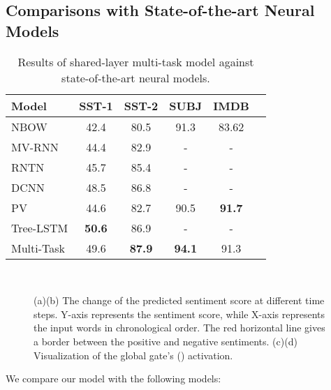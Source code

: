 \documentclass{article}
\begin{document}
\subsection{Comparisons with State-of-the-art Neural Models}



\begin{table}[!th]\small
\center
\begin{tabular}{|l|*{5}{c|}}
\hline
\textbf{Model} &	 SST-1 &	 SST-2 &	SUBJ&	 IMDB \\

\hline
NBOW & 42.4 & 80.5 & 91.3 & 83.62 \\
MV-RNN  &	 44.4 &	 82.9 &	 -&	 - \\
RNTN  &	 45.7 &	 85.4 &	 -&	 - \\
DCNN  &	 48.5&	 86.8 &	 - &	 - \\
PV  &	 44.6&	 82.7 & 90.5 &	 \textbf{91.7} \\
Tree-LSTM  &	 \textbf{50.6}&	 86.9 & - & - \\
\hline
Multi-Task &   49.6    &   \textbf{87.9}    &   \textbf{94.1}    &    91.3    \\

\hline
\end{tabular}
\caption{Results of shared-layer multi-task model against state-of-the-art neural models.}\label{tab:result-4}
\end{table}

\begin{figure*}[!t]
\centering
{}
   \\
  \caption{(a)(b) The change of the predicted sentiment score at different time steps. Y-axis represents the sentiment score, while X-axis represents the input words in chronological order. The red horizontal line gives a border between the positive and negative sentiments. (c)(d) Visualization of the global gate's () activation.
}\label{fig:exp-case}
\end{figure*}


We compare our model with the following models:
\end{document}
